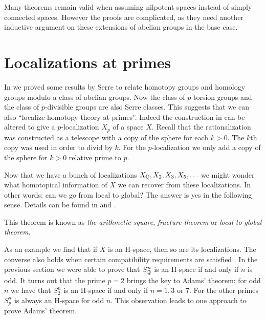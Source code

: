 Many theorems remain valid when assuming nilpotent spaces instead of simply connected spaces. However the proofs are complicated, as they need another inductive argument on these extensions of abelian groups in the base case.

\section{Localizations at primes}
In  we proved some results by Serre to relate homotopy groups and homology groups modulo a class of abelian groups. Now the class of $p$-torsion groups and the class of $p$-divisible groups are also Serre classes. This suggests that we can also ``localize homotopy theory at primes''. Indeed the construction in  can be altered to give a $p$-localization $X_p$ of a space $X$. Recall that the rationalization was constructed as a telescope with a copy of the sphere for each $k > 0$. The $k$th copy was used in order to divid by $k$. For the $p$-localization we only add a copy of the sphere for $k > 0$ relative prime to $p$.

Now that we have a bunch of localizations $X_{\mathbb{Q}}, X_2, X_3, X_5, \ldots$ we might wonder what homotopical information of $X$ we can recover from these localizations. In other words: can we go from local to global? The answer is yes in the following sense. Details can be found in \cite{may2} and \cite{sullivan}.


This theorem is known as \emph{the arithmetic square}, \emph{fracture theorem} or \emph{local-to-global theorem}.

As an example we find that if $X$ is an H-space, then so are its localizations. The converse also holds when certain compatibility requirements are satisfied \cite{sullivan}. In the previous section we were able to prove that $S^n_{\mathbb{Q}}$ is an H-space if and only if $n$ is odd. It turns out that the prime $p=2$ brings the key to Adams' theorem: for odd $n$ we have that $S^n_2$ is an H-space if and only if $n=1, 3$ or $7$. For the other primes $S^n_p$ is always an H-space for odd $n$. This observation leads to one approach to prove Adams' theorem.
